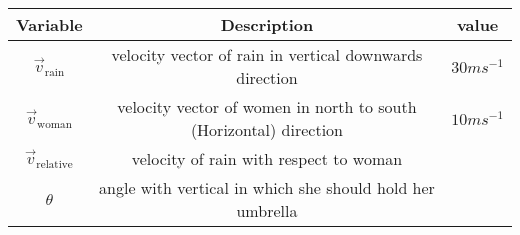\begin{tabular}[12pt]{ |c| c| c| }
    \hline
	\textbf{Variable}  & \textbf{Description}  & \textbf{value }  \\
    \hline
	$\vec{v}_{\text{rain}}$ & velocity vector of rain in vertical downwards direction & $30 ms^{-1}$\\
    \hline 
	$\vec{v}_{\text{woman}}$ & velocity vector of women in north to south (Horizontal) direction & $10 ms^{-1}$ \\
    \hline
	$\vec{v}_{\text{relative}}$& velocity of rain with respect to woman  \\  
    \hline 
        $\theta$ & angle with vertical in which she should hold her umbrella \\
    \hline    
            
\end{tabular}